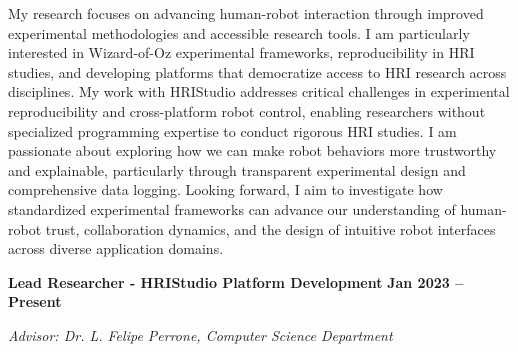 \documentclass{article}
\begin{document}



My research focuses on advancing human-robot interaction through improved experimental methodologies and accessible research tools. I am particularly interested in Wizard-of-Oz experimental frameworks, reproducibility in HRI studies, and developing platforms that democratize access to HRI research across disciplines. My work with HRIStudio addresses critical challenges in experimental reproducibility and cross-platform robot control, enabling researchers without specialized programming expertise to conduct rigorous HRI studies. I am passionate about exploring how we can make robot behaviors more trustworthy and explainable, particularly through transparent experimental design and comprehensive data logging. Looking forward, I aim to investigate how standardized experimental frameworks can advance our understanding of human-robot trust, collaboration dynamics, and the design of intuitive robot interfaces across diverse application domains.






 \hfill {}

\textbf{Lead Researcher - HRIStudio Platform Development} \hfill \textbf{Jan 2023 – Present}

\textit{Advisor: Dr. L. Felipe Perrone, Computer Science Department}
\end{document}
